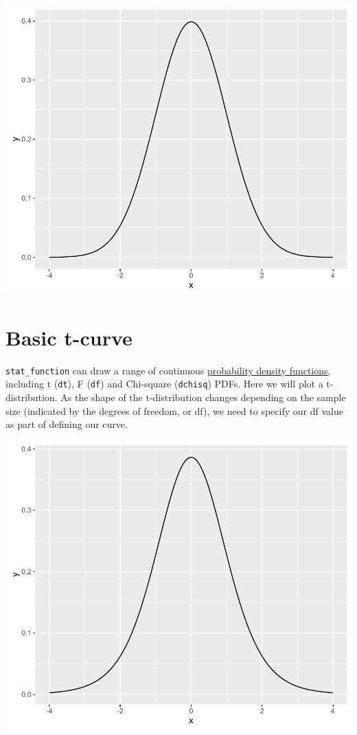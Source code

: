 \begin{center}\includegraphics[width=0.6\linewidth]{9_Function_Plots_pdf/function_1-1} \end{center}

\section{Basic t-curve}\label{basic-t-curve}

\texttt{stat\_function} can draw a range of continuous
\href{https://en.wikipedia.org/wiki/Probability_density_function}{probability
density functions}, including t (\texttt{dt}), F (\texttt{df}) and
Chi-square (\texttt{dchisq}) PDFs. Here we will plot a t-distribution.
As the shape of the t-distribution changes depending on the sample size
(indicated by the degrees of freedom, or df), we need to specify our df
value as part of defining our curve.

\begin{Shaded}
\begin{Highlighting}[]
\StringTok{ }\NormalTok{(}\NormalTok{(} \NormalTok{(-}\NormalTok{, }\NormalTok{)), }\NormalTok{(} 
\StringTok{  }\NormalTok{(}  \NormalTok{(} \NormalTok{))}
\end{Highlighting}
\end{Shaded}

\begin{center}\includegraphics[width=0.6\linewidth]{9_Function_Plots_pdf/function_2-1} \end{center}

